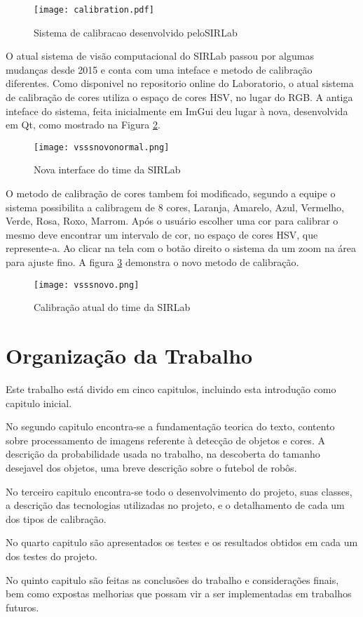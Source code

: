 \begin{figure}[!h]
	\centering
	\texttt{[image: calibration.pdf]} 	
	\caption{Sistema de calibracao desenvolvido peloSIRLab \cite{VSSVision}}
	\label{SIRLabCalibracaoHSV}
\end{figure}

O atual sistema de visão computacional do SIRLab passou por algumas mudanças desde 2015 e conta com uma inteface e metodo de calibração diferentes\cite{VSSVision}. 
Como disponivel no repositorio online do Laboratorio, o atual sistema de calibração de cores utiliza o espaço de cores HSV, no lugar do RGB\cite{Rosa:2015}. A antiga inteface do sistema, feita inicialmente em ImGui deu lugar à nova, desenvolvida em Qt, como mostrado na Figura \ref{SIRLabNova}.
\begin{figure}[!h]
	\centering
	\texttt{[image: vsssnovonormal.png]} 	
	\caption{Nova interface do time da SIRLab \cite{VSSVision}}
	\label{SIRLabNova}
\end{figure}

O metodo de calibração de cores tambem foi modificado, segundo a equipe\cite{VSSVision} o sistema possibilita a calibragem de 8 cores, Laranja, Amarelo, Azul, Vermelho, Verde, Rosa, Roxo, Marrom. Após o usuário escolher uma cor para calibrar o mesmo deve encontrar um intervalo de cor, no espaço de cores HSV, que represente-a. Ao clicar na tela com o botão direito o sistema da um zoom na área para ajuste fino. A figura \ref{SIRLabNovaCalibracao} demonstra o novo metodo de calibração.

\begin{figure}[!h]
	\centering
	\texttt{[image: vsssnovo.png]} 	
	\caption{Calibração atual do time da SIRLab \cite{VSSVision}}
	\label{SIRLabNovaCalibracao}
\end{figure}


\section{Organização da Trabalho} \label{Sec:Organizacao}

Este trabalho está divido em cinco capitulos, incluindo esta introdução como capitulo inicial.

No segundo capitulo encontra-se a fundamentação teorica do texto, contento sobre processamento de imagens referente à detecção de objetos e cores. A descrição da probabilidade usada no trabalho, na descoberta do tamanho desejavel dos objetos, uma breve descrição sobre o futebol de robôs. 

No terceiro capitulo encontra-se todo o desenvolvimento do projeto, suas classes, a descrição das tecnologias utilizadas no projeto, e o detalhamento de cada um dos tipos de calibração.

No quarto capitulo são apresentados os testes e os resultados obtidos em cada um dos testes do projeto.

No quinto capitulo são feitas as conclusões do trabalho e considerações finais, bem como expostas melhorias que possam vir a ser implementadas em trabalhos futuros.